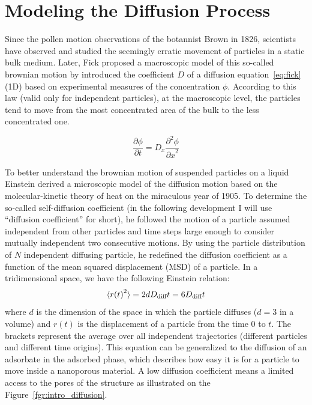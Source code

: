 \documentclass[main]{subfiles}
\begin{document}
\section{Modeling the Diffusion Process}

Since the pollen motion observations of the botannist Brown in 1826, scientists have observed and studied the seemingly erratic movement of particles in a static bulk medium. Later, Fick proposed a macroscopic model of this so-called brownian motion by introduced the coefficient $D$ of a diffusion equation~\ref{eq:fick} (1D) based on experimental measures of the concentration $\phi$.\autocite{Fick_1855} According to this law (valid only for independent particles), at the macroscopic level, the particles tend to move from the most concentrated area of the bulk to the less concentrated one. 

\begin{equation}\label{eq:fick}
  \frac{\partial \phi}{\partial t} = D_x \frac{\partial^2 \phi}{{\partial x}^2}
\end{equation}

To better understand the brownian motion of suspended particles on a liquid Einstein derived a microscopic model of the diffusion motion based on the molecular-kinetic theory of heat on the miraculous year of 1905.\autocite{einstein1905motion} To determine the so-called self-diffusion coefficient (in the following development I will use ``diffusion coefficient'' for short), he followed the motion of a particle assumed independent from other particles and time steps large enough to consider mutually independent two consecutive motions. By using the particle distribution of $N$ independent diffusing particle, he redefined the diffusion coefficient as a function of the mean squared displacement (MSD) of a particle. In a tridimensional space, we have the following Einstein relation:
\begin{equation}\label{eq:einstein}
  \langle {r(t)}^2 \rangle = 2dD_{\text{diff}}t = 6D_{\text{diff}}t
\end{equation}
where  $d$ is the dimension of the space in which the particle diffuses ($d=3$ in a volume) and $r(t)$ is the displacement of a particle from the time $0$ to $t$. The brackets represent the average over all independent trajectories (different particles and different time origins). This equation can be generalized to the diffusion of an adsorbate in the adsorbed phase, which describes how easy it is for a particle to move inside a nanoporous material. A low diffusion coefficient means a limited access to the pores of the structure as illustrated on the Figure~\ref{fgr:intro_diffusion}.
\end{document}
